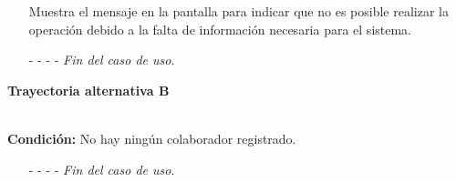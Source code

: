 \begin{enumerate}
	\UCpaso[\UCsist] Muestra el mensaje  en la pantalla  para indicar que no es posible realizar la operación debido a la falta de información necesaria para el sistema.
	\item[- -] - - {\em {Fin del caso de uso}}.%
\end{enumerate}
	\hypertarget{CU2-1:TAB}{\textbf{Trayectoria alternativa B}}\\
	\noindent \textbf{Condición:} No hay ningún colaborador registrado.
	\begin{enumerate}
		\UCpaso[\UCsist] Muestra el mensaje  en la pantalla  para indicar que no existen colaboradores registrados.
		\item[- -] - - {\em {Fin del caso de uso}}.%
	\end{enumerate}
	
